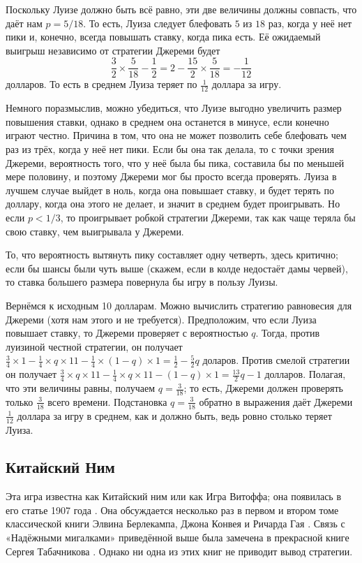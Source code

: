 Поскольку Луизе должно быть всё равно, эти две величины должны совпасть, что даёт нам $p = 5/18$.
То есть, Луиза следует блефовать $5$ из $18$ раз, когда у неё нет пики и, конечно, всегда повышать ставку, когда пика есть.
Её ожидаемый выигрыш независимо от стратегии Джереми будет
\[\frac32\times\frac5{18}-\frac12=2-\frac{15}2\times\frac5{18}=-\frac1{12}\]
долларов.
То есть в среднем Луиза теряет по $\tfrac1{12}$ доллара за игру.

Немного поразмыслив, можно убедиться, что Луизе выгодно увеличить размер повышения ставки,
однако в среднем она останется в минусе, если конечно играют честно.
Причина в том, что она не может позволить себе блефовать чем раз из трёх, когда у неё нет пики.
Если бы она так делала, то с точки зрения Джереми, вероятность того, что у неё была бы пика, составила бы по меньшей мере половину, и поэтому Джереми мог бы просто всегда проверять.
Луиза в лучшем случае выйдет в ноль, когда она повышает ставку, и будет терять по доллару, когда она этого не делает, и значит в среднем будет проигрывать.
Но если $p < 1/3$, то проигрывает робкой стратегии Джереми, так как чаще теряла бы свою ставку, чем выигрывала у Джереми.

То, что вероятность вытянуть пику составляет одну четверть, здесь критично; если бы шансы были чуть выше (скажем, если в колде недостаёт дамы червей), то ставка большего размера повернула бы игру в пользу Луизы.

Вернёмся к исходным 10 долларам.
Можно вычислить стратегию равновесия для Джереми (хотя нам этого и не требуется).
Предположим, что если Луиза повышает ставку, то Джереми проверяет с вероятностью $q$.
Тогда, против луизиной честной стратегии, он получает $\tfrac34 \times 1 - \tfrac14 \times q \times 11 - \tfrac14 \times (1 - q) \times 1 = \tfrac12 - \tfrac52q$ доларов.
Против смелой стратегии он получает $\tfrac34 \times q \times 11 - \tfrac14 \times q \times 11 - (1 - q) \times 1 = \tfrac{13}2q - 1$ долларов.
Полагая, что эти величины равны, получаем $q = \tfrac3{18}$; то есть, Джереми должен проверять только $\tfrac3{18}$ всего времени.
Подстановка $q = \tfrac3{18}$ обратно в выражения даёт Джереми $\tfrac1{12}$ доллара за игру в среднем, как и должно быть, ведь ровно столько теряет Луиза.

\subsection*{Китайский Ним}

Эта игра известна как Китайский ним или как Игра Витоффа;
она появилась в его статье 1907 года \cite{wythoff}.
Она обсуждается несколько раз в первом и втором томе классической книги Элвина Берлекампа, Джона Конвея и Ричарда  Гая \cite{berlekamp-conway-guy}.
Связь с «Надёжными мигалками» приведённой выше была замечена в прекрасной книге Сергея Табачникова \cite{tabachnikov}.
Однако ни одна из этих книг не приводит вывод стратегии.

